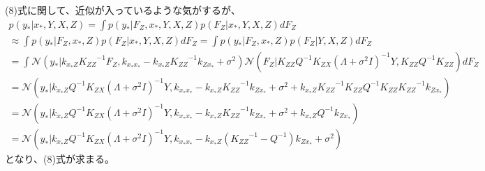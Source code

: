 ﻿\documentclass{jsarticle}
\begin{document}
(8)式に関して、近似が入っているような気がするが、
\begin{equation}
\begin{split}
p(y_* | x_*, Y, X, Z) = \int p(y_* | F_Z, x_*, Y, X, Z)p(F_Z | x_*, Y, X, Z) dF_Z\\
\approx \int p(y_* | F_Z, x_*, Z)p(F_Z | x_*, Y, X, Z) dF_Z 
= \int p(y_* | F_Z, x_*, Z)p(F_Z | Y, X, Z) dF_Z\\
= \int \mathcal{N}(y_* | k_{x_* Z} {K_{ZZ}}^{-1} F_Z, k_{x_* x_*} - k_{x_* Z} {K_{ZZ}}^{-1} k_{Zx_*} + \sigma^2)\mathcal{N}(F_Z | {K_{ZZ}} Q^{-1} K_{ZX}(\Lambda + \sigma^2 I)^{-1}Y, {K_{ZZ}} Q^{-1} {K_{ZZ}}) dF_Z\\
=\mathcal{N}(y_* | k_{x_* Z} Q^{-1} K_{ZX}(\Lambda + \sigma^2 I)^{-1}Y, k_{x_* x_*} - k_{x_* Z} {K_{ZZ}}^{-1} k_{Zx_*} + \sigma^2 + k_{x_* Z} {K_{ZZ}}^{-1} {K_{ZZ}} Q^{-1} {K_{ZZ}} {K_{ZZ}}^{-1} k_{Z x_*})\\
=\mathcal{N}(y_* | k_{x_* Z} Q^{-1} K_{ZX}(\Lambda + \sigma^2 I)^{-1}Y, k_{x_* x_*} - k_{x_* Z} {K_{ZZ}}^{-1} k_{Zx_*} + \sigma^2 + k_{x_* Z} Q^{-1} k_{Z x_*})\\
=\mathcal{N}(y_* | k_{x_* Z} Q^{-1} K_{ZX}(\Lambda + \sigma^2 I)^{-1}Y, k_{x_* x_*} - k_{x_* Z} ({K_{ZZ}}^{-1} - Q^{-1})k_{Zx_*} + \sigma^2)
\end{split}
\end{equation}
となり、(8)式が求まる。
\end{document}
